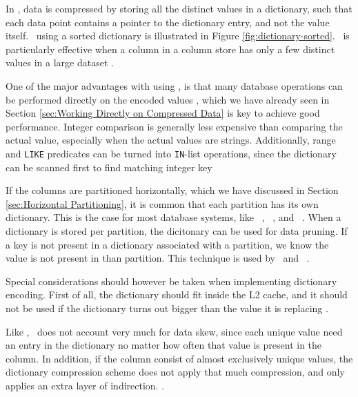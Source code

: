In \de, data is compressed by storing all the distinct values in a dictionary, such that each data point contains a pointer to the dictionary entry, and not the value itself. \de~using a sorted dictionary is illustrated in Figure \ref{fig:dictionary-sorted}. \de~is particularly effective when a column in a column store has only a few distinct values in a large dataset \cite{Faust2015-ke}.

One of the major advantages with using \de, is that many database operations can be performed directly on the encoded values \cite{Faust2015-ke}, which we have already seen in Section \ref{sec:Working Directly on Compressed Data} is key to achieve good performance. Integer comparison is generally less expensive than comparing the actual value, especially when the actual values are strings. Additionally, range and \texttt{LIKE} predicates can be turned into \texttt{IN}-list operations, since the dictionary can be scanned first to find matching integer key \cite{Barber2012-xt}

If the columns are partitioned horizontally, which we have discussed in Section \ref{sec:Horizontal Partitioning}, it is common that each partition has its own dictionary. This is the case for most database systems, like \oracle~\cite{Lahiri2015-mz}, \blink~\cite{Barber2012-xt}, and \mssql~\cite{Larson2013-mc}. When a dictionary is stored per partition, the dicitonary can be used for data pruning. If a key is not present in a dictionary associated with a partition, we know the value is not present in than partition. This technique is used by \blink~and \monetx~\cite{Barber2012-xt, Boncz2012-xt}.

Special considerations should however be taken when implementing dictionary encoding. First of all, the dictionary should fit inside the L2 cache, and it should not be used if the dictionary turns out bigger than the value it is replacing \cite{Holloway2008-rr}. 

Like \bp, \de~does not account very much for data skew, since each unique value need an entry in the dictionary no matter how often that value is present in the column. In addition, if the column consist of almost exclusively unique values, the dictionary compression scheme does not apply that much compression, and only applies an extra layer of indirection. .

